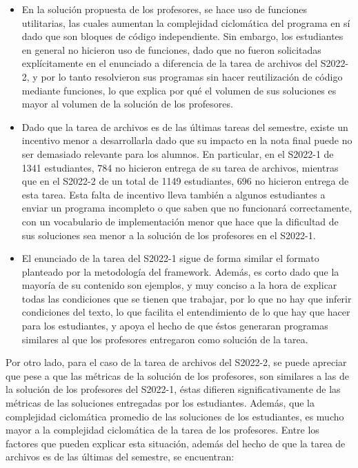 \documentclass[letterpaper,12pt]{article}
\begin{document}
\begin{itemize}
  \item En la solución propuesta de los profesores, se hace uso de funciones utilitarias, las cuales aumentan la complejidad ciclomática del programa en sí dado que son bloques de código independiente. Sin embargo, los estudiantes en general no hicieron uso de funciones, dado que no fueron solicitadas explícitamente en el enunciado a diferencia de la tarea de archivos del S2022-2, y por lo tanto resolvieron sus programas sin hacer reutilización de código mediante funciones, lo que explica por qué el volumen de sus soluciones es mayor al volumen de la solución de los profesores.
  \item Dado que la tarea de archivos es de las últimas tareas del semestre, existe un incentivo menor a desarrollarla dado que su impacto en la nota final puede no ser demasiado relevante para los alumnos. En particular, en el S2022-1 de 1341 estudiantes, 784 no hicieron entrega de su tarea de archivos, mientras que en el S2022-2 de un total de 1149 estudiantes, 696 no hicieron entrega de esta tarea. Esta falta de incentivo lleva también a algunos estudiantes a enviar un programa incompleto o que saben que no funcionará correctamente, con un vocabulario de implementación menor que hace que la dificultad de sus soluciones sea menor a la solución de los profesores en el S2022-1.
  \item El enunciado de la tarea del S2022-1 sigue de forma similar el formato planteado por la metodología del framework. Además, es corto dado que la mayoría de su contenido son ejemplos, y muy conciso a la hora de explicar todas las condiciones que se tienen que trabajar, por lo que no hay que inferir condiciones del texto, lo que facilita el entendimiento de lo que hay que hacer para los estudiantes, y apoya el hecho de que éstos generaran programas similares al que los profesores entregaron como solución de la tarea.
\end{itemize}

Por otro lado, para el caso de la tarea de archivos del S2022-2, se puede apreciar que pese a que las métricas de la solución de los profesores, son similares a las de la solución de los profesores del S2022-1, éstas difieren significativamente de las métricas de las soluciones entregadas por los estudiantes. Además, que la complejidad ciclomática promedio de las soluciones de los estudiantes, es mucho mayor a la complejidad ciclomática de la tarea de los profesores. Entre los factores que pueden explicar esta situación, además del hecho de que la tarea de archivos es de las últimas del semestre, se encuentran:
\end{document}
